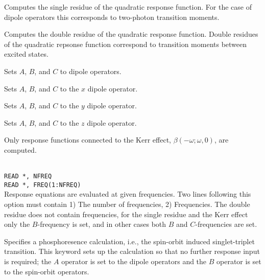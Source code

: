 \begin{description}

\item{}
Computes the single residue of the quadratic
response function.
For the case of dipole operators this corresponds to two-photon
transition moments.

\item{}
Computes the double residue of the quadratic
response function.
Double residues of the quadratic repsonse function correspond to transition
moments between excited states. 

\item{}
Sets $A$, $B$, and $C$ to dipole operators.

\item{}
Sets $A$, $B$, and $C$ to the $x$ dipole operator.

\item{}
Sets $A$, $B$, and $C$ to the $y$ dipole operator.

\item{}
Sets $A$, $B$, and $C$ to the $z$ dipole operator.

\item{}
Only response functions connected to the Kerr effect, 
$\beta(-\omega; \omega,0)$, are computed.

\item{}\\
\verb|READ *, NFREQ|\\
\verb|READ *, FREQ(1:NFREQ)|\\
Response equations are evaluated at given
frequencies. Two lines 
following this option must contain 1) The number of frequencies, 2)
Frequencies.  The double residue does not contain frequencies, for the
single residue and the Kerr effect only the $B$-frequency is set,
and in other cases both $B$ and $C$-frequencies are set.

\item{}
Specifies a phosphoresence calculation, i.e.,
the spin-orbit 
induced singlet-triplet transition. This keyword sets up the  
calculation so that no further response input is required; the
$A$ operator is set to the dipole operators and
the $B$ operator  
is set to the spin-orbit
operators. \cite{ovhapjhjajthjojcp97,haovbmaqc27} 


\end{description}
